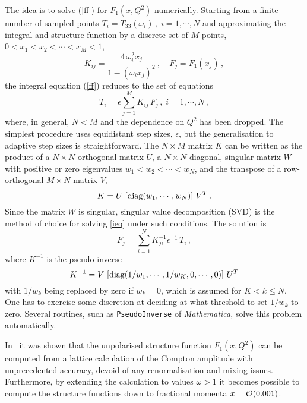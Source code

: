The idea is to solve (\ref{ff}) for $F_1(x,Q^2)$ numerically. Starting from a finite number of sampled points $T_i=T_{33}(\omega_i) \,,\; i=1, \cdots, N$ and approximating the integral and structure function by a discrete set of $M$ points, $0 < x_1 < x_2 < \cdots < x_M < 1$, 
\begin{equation}
K_{ij} = \frac{4\,\omega_i^2x_j}{1-(\omega_i x_j)^2} \,, \quad F_j = F_1(x_j)\,,
\end{equation}
the integral equation (\ref{ff}) reduces to the set of equations 
\begin{equation}
T_i = \epsilon \sum_{j=1}^M K_{ij}\, F_j \,,\; i=1, \cdots, N \,,
\label{ieq}
\end{equation}
where, in general, $N < M$ and the dependence on $Q^2$ has been dropped. The simplest procedure uses equidistant step sizes, $\epsilon$, but the generalisation to adaptive step sizes is straightforward. The $N \times M$ matrix $K$ can be written as the product of a $N \times N$ orthogonal matrix $U$, a $N \times N$ diagonal, singular matrix $W$ with positive or zero eigenvalues $w_1 < w_2 < \cdots < w_N$, and the transpose of a row-orthogonal $M \times N$ matrix $V$,
\begin{equation}
K = U \,\left[{\rm diag}(w_1, \cdots, w_N)\right]\,V^T \,.
\end{equation}
Since the matrix $W$ is singular, singular value decomposition (SVD) is the method of choice for solving \eqref{ieq} under such conditions. The solution is
\begin{equation}
F_j = \sum_{i=1}^N K^{-1}_{ji}\epsilon^{-1}\, T_i \,, 
\label{svd}
\end{equation}
where $K^{-1}$ is the pseudo-inverse
\begin{equation}
K^{-1} = V \,\left[{\rm diag}(1/w_1, \cdots, 1/w_K, 0, \cdots, 0)\right]\, U^T 
\end{equation}
with $1/w_k$ being replaced by zero if $w_k=0$, which is assumed for $K < k \leq N$. One has to exercise some discretion at deciding at
what threshold to set $1/w_k$ to zero. Several routines, such as {\tt PseudoInverse} of {\it Mathematica}, solve this problem
automatically. 

In~\cite{Chambers:2017dov} it was shown that the unpolarised structure function $F_1(x,Q^2)$ can be computed from a lattice calculation of the Compton amplitude with unprecedented accuracy, devoid of any renormalisation and mixing issues. Furthermore, by extending the calculation to values $\omega > 1$ it becomes possible
to compute the structure functions down to fractional momenta $x = {\cal O}(0.001)$.

